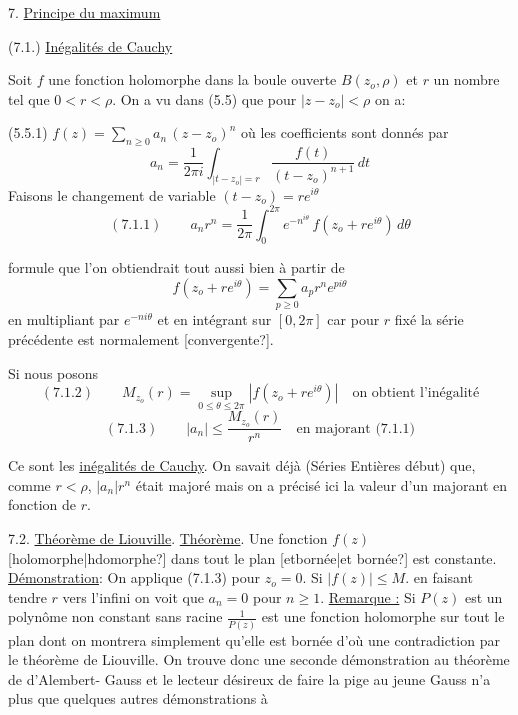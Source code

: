 \documentclass[11pt]{article}
\newcommand{\scanpage}[1]{\par\bigskip\noindent{\small\sffamily[scan #1]}\par}
\newcommand{\mspage}[1]{{\small\sffamily[p.\,#1]}}
\newcommand{\hand}[1]{\textcolor{blue}{#1}}
\newcommand{\uline}[1]{\underline{#1}}
\newcommand{\unsure}[1]{[#1?]}
\begin{document}
7. \uline{Principe du maximum}

(7.1.) \uline{Inégalités de Cauchy}

Soit $f$ une fonction holomorphe dans la boule ouverte $B(z_o,\rho)$ et
$r$ un nombre tel que $0 < r < \rho$. On a vu dans (5.5) que pour $|z - z_o| < \rho$ on
a:

\mspage{\hand{182}}

\clearpage
\scanpage{119/183}
\mspage{- 2 -}

(5.5.1) \quad $f(z) = \sum_{n \geq 0} a_n \, (z-z_o)^n$ \quad où les coefficients sont donnés par
\[ a_n = \frac{1}{2 \pi i} \int_{|t-z_o|=r} \frac{f(t)}{(t-z_o)^{n+1}} \, dt \]
Faisons le changement de variable \quad $(t-z_o) = r e^{i\theta}$
\[ (7.1.1) \qquad a_n r^n = \frac{1}{2\pi} \int_0^{2\pi} e^{-n^{i\theta}} \, f(z_o + re^{i\theta}) \, d\theta \]

formule que l'on obtiendrait tout aussi bien à partir de
\[ f(z_o + re^{i\theta}) = \sum_{p \geq 0} a_p r^n e^{pi\theta} \]
en multipliant par $e^{-ni\theta}$ et en intégrant sur $[0,2\pi]$ car pour $r$ fixé la série
précédente est normalement \unsure{convergente}.

Si nous posons
\[ (7.1.2) \qquad M_{z_o}(r) = \sup_{0 \leq \theta \leq 2\pi} |f(z_o + re^{i\theta})| \quad \text{on obtient l'inégalité} \]
\[ (7.1.3) \qquad |a_n| \leq \frac{M_{z_o}(r)}{r^n} \quad \text{en majorant (7.1.1)} \]

Ce sont les \uline{inégalités de Cauchy}. On savait déjà (Séries Entières
début) que, comme $r < \rho$, $|a_n| r^n$ était majoré mais on a précisé ici la valeur
d'un majorant en fonction de $r$.

7.2. \uline{Théorème de Liouville}.
\uline{Théorème}. Une fonction $f(z)$ \unsure{holomorphe|hdomorphe} dans tout le plan \unsure{etbornée|et bornée} est constante.
\uline{Démonstration}: On applique (7.1.3) pour $z_o = 0$.
Si $|f(z)| \leq M$. en faisant tendre $r$ vers l'infini on voit que
$a_n = 0$ pour $n \geq 1$.
\uline{Remarque :} Si $P(z)$ est un polynôme non constant sans racine $\frac{1}{P(z)}$ est une
fonction holomorphe sur tout le plan dont on montrera simplement qu'elle est
bornée d'où une contradiction par le théorème de Liouville. On trouve donc une
seconde démonstration au théorème de d'Alembert- Gauss et le lecteur désireux
de faire la pige au jeune Gauss n'a plus que quelques autres démonstrations à
\end{document}
